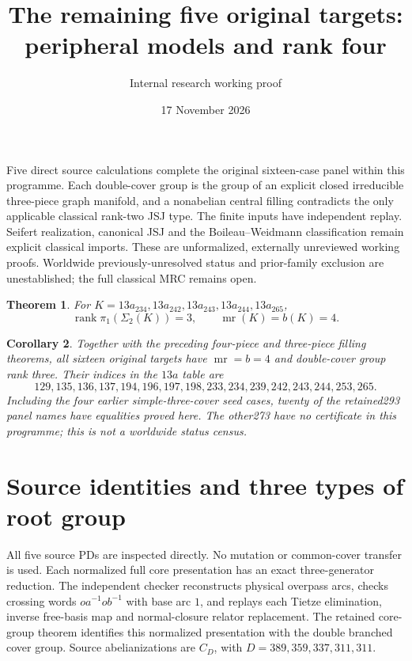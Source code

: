 \documentclass[11pt]{article}
\title{The remaining five original targets: peripheral models and rank four}
\author{Internal research working proof}
\date{17 November 2026}
\newtheorem{theorem}{Theorem}
\newtheorem{corollary}[theorem]{Corollary}
\newcommand{\rank}{\operatorname{rank}}
\newcommand{\mr}{\operatorname{mr}}
\begin{document}
\maketitle

Five direct source calculations complete the original sixteen-case panel
within this programme. Each double-cover group is the group of an explicit
closed irreducible three-piece graph manifold, and a nonabelian central
filling contradicts the only applicable classical rank-two JSJ type.
The finite inputs have independent replay. Seifert realization, canonical
JSJ and the Boileau--Weidmann classification remain explicit classical
imports. These are unformalized, externally unreviewed working proofs.
Worldwide previously-unresolved status and prior-family exclusion are
unestablished; the full classical MRC remains open.

\begin{theorem}\label{thm:five}
For $K=13a_{234},13a_{242},13a_{243},13a_{244},13a_{265}$,
\[
 \rank\pi_1(\Sigma_2(K))=3,\qquad \mr(K)=b(K)=4.
\]
\end{theorem}

\begin{corollary}
Together with the preceding four-piece and three-piece filling theorems,
all sixteen original targets have $\mr=b=4$ and double-cover group rank
three. Their indices in the $13a$ table are
\[
129,135,136,137,194,196,197,198,233,234,239,242,243,244,253,265.
\]
Including the four earlier simple-three-cover seed cases, twenty of the
retained293 panel names have equalities proved here. The other273 have
no certificate in this programme; this is not a worldwide status census.
\end{corollary}

\section{Source identities and three types of root group}

All five source PDs are inspected directly. No mutation or common-cover
transfer is used. Each normalized full core presentation has an exact
three-generator reduction. The independent checker reconstructs physical
overpass arcs, checks crossing words $o a^{-1}o b^{-1}$ with base arc $1$,
and replays each Tietze elimination, inverse free-basis map and
normal-closure relator replacement. The retained core-group theorem
identifies this normalized presentation with the double branched cover
group. Source abelianizations are $C_D$, with $D=389,359,337,311,311$.
\end{document}
